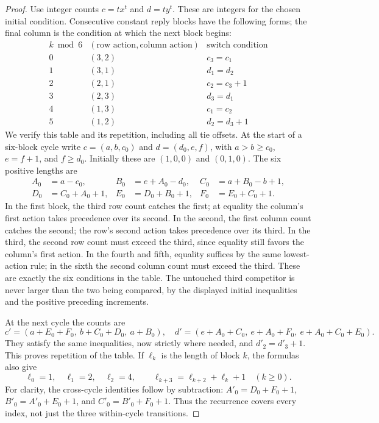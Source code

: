 \documentclass[11pt,a4paper]{article}
\theoremstyle{definition}
\theoremstyle{remark}
\begin{document}
\begin{proof}
Use integer counts $c=tx^t$ and $d=ty^t$. These are integers for the chosen initial
condition. Consecutive constant reply blocks have the following forms; the final
column is the condition at which the next block begins:
\[
\begin{array}{c|c|c}
 k\bmod6&(\text{row action},\text{column action})&\text{switch condition}\\\hline
 0&(3,2)&c_3=c_1\\
 1&(3,1)&d_1=d_2\\
 2&(2,1)&c_2=c_3+1\\
 3&(2,3)&d_3=d_1\\
 4&(1,3)&c_1=c_2\\
 5&(1,2)&d_2=d_3+1
\end{array}
\]
We verify this table and its repetition, including all tie offsets. At the start
of a six-block cycle write $c=(a,b,c_0)$ and $d=(d_0,e,f)$, with
$a>b\geq c_0$, $e=f+1$, and $f\geq d_0$. Initially these are $(1,0,0)$ and
$(0,1,0)$. The six positive lengths are
\begin{align*}
 A_0&=a-c_0, &B_0&=e+A_0-d_0, &C_0&=a+B_0-b+1,\\
 D_0&=C_0+A_0+1, &E_0&=D_0+B_0+1, &F_0&=E_0+C_0+1.
\end{align*}
In the first block, the third row count catches the first; at equality the column's
first action takes precedence over its second. In the second, the first column
count catches the second; the row's second action takes precedence over its third.
In the third, the second row count must exceed the third, since equality still
favors the column's first action. In the fourth and fifth, equality suffices by
the same lowest-action rule; in the sixth the second column count must exceed
the third. These are exactly the six conditions in the table. The untouched
third competitor is never larger than the two being compared, by the displayed
initial inequalities and the positive preceding increments.

At the next cycle the counts are
\[
 c'=(a+E_0+F_0,\ b+C_0+D_0,\ a+B_0),\quad
 d'=(e+A_0+C_0,\ e+A_0+F_0,\ e+A_0+C_0+E_0).
\]
They satisfy the same inequalities, now strictly where needed, and $d'_2=d'_3+1$.
This proves repetition of the table. If $\ell_k$ is the length of block $k$, the
formulas also give
\[
 \ell_0=1,\quad\ell_1=2,\quad\ell_2=4,\qquad
 \ell_{k+3}=\ell_{k+2}+\ell_k+1\quad(k\geq0).
\]
For clarity, the cross-cycle identities follow by subtraction:
$A'_0=D_0+F_0+1$, $B'_0=A'_0+E_0+1$, and
$C'_0=B'_0+F_0+1$. Thus the recurrence covers every index, not just the
three within-cycle transitions.


\end{proof}
\end{document}
